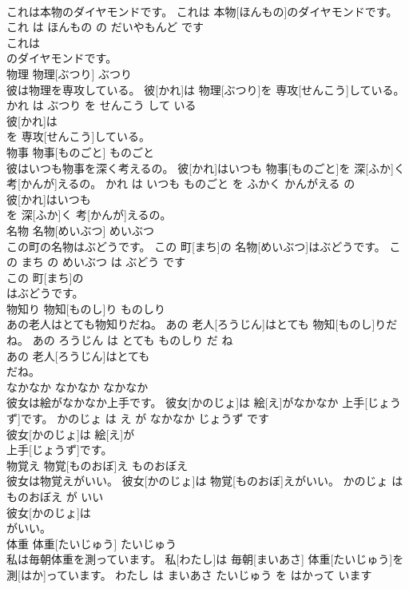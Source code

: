 \documentclass[8pt]{extreport}
\begin{document}
\begin{CJK}{UTF8}{min}
\\	これは本物のダイヤモンドです。	これは 本物[ほんもの]のダイヤモンドです。	これ は ほんもの の だいやもんど です	
\\	これは
\\	のダイヤモンドです。			
\\	物理	物理[ぶつり]	ぶつり	
\\	彼は物理を専攻している。	彼[かれ]は 物理[ぶつり]を 専攻[せんこう]している。	かれ は ぶつり を せんこう して いる	
\\	彼[かれ]は
\\	を 専攻[せんこう]している。			
\\	物事	物事[ものごと]	ものごと	
\\	彼はいつも物事を深く考えるの。	彼[かれ]はいつも 物事[ものごと]を 深[ふか]く 考[かんが]えるの。	かれ は いつも ものごと を ふかく かんがえる の	
\\	彼[かれ]はいつも
\\	を 深[ふか]く 考[かんが]えるの。			
\\	名物	名物[めいぶつ]	めいぶつ	
\\	この町の名物はぶどうです。	この 町[まち]の 名物[めいぶつ]はぶどうです。	この まち の めいぶつ は ぶどう です	
\\	この 町[まち]の
\\	はぶどうです。			
\\	物知り	物知[ものし]り	ものしり	
\\	あの老人はとても物知りだね。	あの 老人[ろうじん]はとても 物知[ものし]りだね。	あの ろうじん は とても ものしり だ ね	
\\	あの 老人[ろうじん]はとても
\\	だね。			
\\	なかなか	なかなか	なかなか	
\\	彼女は絵がなかなか上手です。	彼女[かのじょ]は 絵[え]がなかなか 上手[じょうず]です。	かのじょ は え が なかなか じょうず です	
\\	彼女[かのじょ]は 絵[え]が
\\	上手[じょうず]です。			
\\	物覚え	物覚[ものおぼ]え	ものおぼえ	
\\	彼女は物覚えがいい。	彼女[かのじょ]は 物覚[ものおぼ]えがいい。	かのじょ は ものおぼえ が いい	
\\	彼女[かのじょ]は
\\	がいい。			
\\	体重	体重[たいじゅう]	たいじゅう	
\\	私は毎朝体重を測っています。	私[わたし]は 毎朝[まいあさ] 体重[たいじゅう]を 測[はか]っています。	わたし は まいあさ たいじゅう を はかって います	

\end{CJK}
\end{document}
